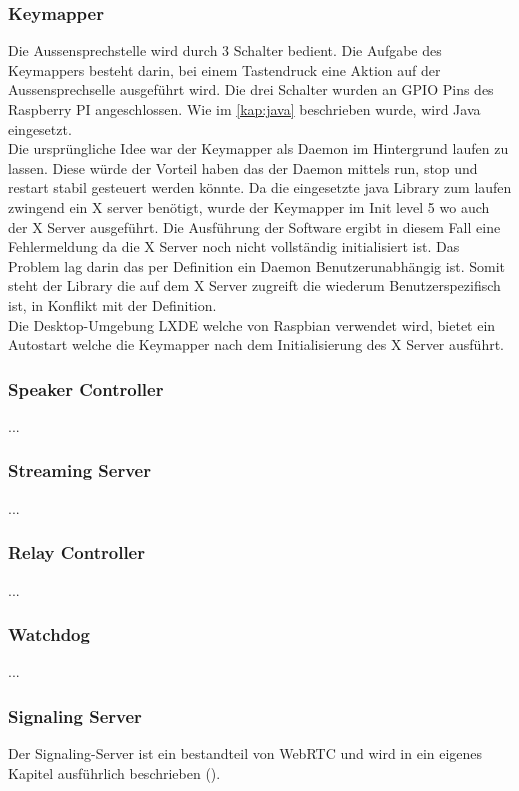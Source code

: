 \subsubsection{Keymapper}
Die Aussensprechstelle wird durch 3 Schalter bedient. Die Aufgabe des Keymappers besteht darin, bei einem Tastendruck eine Aktion auf der Aussensprechselle ausgeführt wird. Die drei Schalter wurden an GPIO Pins des Raspberry PI angeschlossen. Wie im \cref{kap:java}
beschrieben wurde, wird Java eingesetzt. 
\\
Die ursprüngliche Idee war der Keymapper als Daemon im Hintergrund laufen zu lassen. Diese würde der Vorteil haben das der Daemon mittels run, stop und restart stabil gesteuert werden könnte. Da die eingesetzte java Library zum laufen zwingend ein X server benötigt, wurde der Keymapper im Init level 5 wo auch der X Server ausgeführt. Die Ausführung der Software ergibt in diesem Fall eine Fehlermeldung da die X Server noch nicht vollständig initialisiert ist. 
Das Problem lag darin das per Definition ein Daemon Benutzerunabhängig ist. Somit steht der Library die auf dem X Server zugreift die wiederum Benutzerspezifisch ist, in Konflikt mit der Definition. 
\\
Die Desktop-Umgebung LXDE welche von Raspbian verwendet wird, bietet ein Autostart welche die Keymapper nach dem Initialisierung des X Server ausführt.

\subsubsection{Speaker Controller}
...
\subsubsection{Streaming Server}
\label{kap:streamingsrv}
...
\subsubsection{Relay Controller}
...
\subsubsection{Watchdog}
...

\subsubsection{Signaling Server}
Der Signaling-Server ist ein bestandteil von WebRTC und wird in ein eigenes Kapitel ausführlich beschrieben ().

